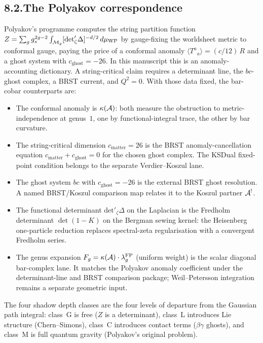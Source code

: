 \subsection*{8.2.\enspace The Polyakov correspondence}

Polyakov's programme computes the string partition function
$Z=\sum_g g_s^{2g-2}\int_{\mathcal{M}_g}[\mathrm{det}'_\zeta\Delta]
^{-d/2}\,d\mu_{\mathrm{WP}}$
by gauge-fixing the worldsheet metric to conformal gauge, paying
the price of a conformal anomaly
$\langle T^a{}_a\rangle=(c/12)\,R$ and a ghost system with
$c_{\mathrm{ghost}}=-26$. In this manuscript this is an
anomaly-accounting dictionary. A string-critical claim requires a determinant line, the
\(bc\)-ghost complex, a BRST current, and \(Q^2=0\). With those data
fixed, the bar-cobar counterparts are:
\begin{itemize}[nosep]
\item The conformal anomaly is $\kappa(\mathcal{A})$: both measure the
 obstruction to metric-independence at genus~$1$, one by
 functional-integral trace, the other by bar curvature.
\item The string-critical dimension \(c_{\mathrm{matter}}=26\) is the
 BRST anomaly-cancellation equation
 \(c_{\mathrm{matter}}+c_{\mathrm{ghost}}=0\) for the chosen ghost
 complex. The KSDual fixed-point condition belongs to the separate
 Verdier--Koszul lane.
\item The ghost system $bc$ with $c_{\mathrm{ghost}}=-26$ is the
 external BRST ghost resolution. A named BRST/Koszul comparison map
 relates it to the Koszul partner $\mathcal{A}^!$.
\item The functional determinant
 $\mathrm{det}'_\zeta\Delta$ on the Laplacian is the Fredholm
 determinant $\det(1-K)$ on the Bergman sewing kernel: the
 Heisenberg one-particle reduction replaces spectral-zeta
 regularisation with a convergent Fredholm series.
\item The genus expansion
 $F_g=\kappa(\mathcal{A})\cdot\lambda_g^{\mathrm{FP}}$ (uniform weight)
 is the scalar diagonal bar-complex lane. It matches the Polyakov
 anomaly coefficient under the determinant-line and BRST comparison
 package; Weil--Petersson integration remains a separate geometric
 input.
\end{itemize}
The four shadow depth classes are the four levels of departure
from the Gaussian path integral: class~G is free ($Z$ is a
determinant), class~L introduces Lie structure (Chern--Simons),
class~C introduces contact terms ($\beta\gamma$ ghosts), and
class~M is full quantum gravity (Polyakov's original problem).

